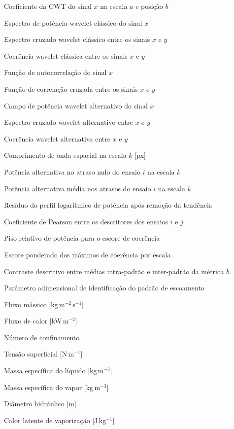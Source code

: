 \begin{simbolos}
  \item[$W_x(a,b)$] Coeficiente da CWT do sinal $x$ na escala $a$ e posição $b$
  \item[$P_x(a,b)$] Espectro de potência wavelet clássico do sinal $x$
  \item[$C_{xy}(a,b)$] Espectro cruzado wavelet clássico entre os sinais $x$ e $y$
  \item[$\gamma_{xy}(a,b)$] Coerência wavelet clássica entre os sinais $x$ e $y$
  \item[$R_{xx}(\tau)$] Função de autocorrelação do sinal $x$
  \item[$R_{xy}(\tau)$] Função de correlação cruzada entre os sinais $x$ e $y$
  \item[$\widetilde{P}_x(a,b)$] Campo de potência wavelet alternativo do sinal $x$
  \item[$\widetilde{C}_{xy}(a,b)$] Espectro cruzado wavelet alternativo entre $x$ e $y$
  \item[$\widetilde{\gamma}_{xy}(a,b)$] Coerência wavelet alternativa entre $x$ e $y$
  \item[$\lambda_k$] Comprimento de onda espacial na escala $k$ [px]
  \item[$P_{ik}$] Potência alternativa no atraso nulo do ensaio $i$ na escala $k$
  \item[$M_{ik}$] Potência alternativa média nos atrasos do ensaio $i$ na escala $k$
  \item[$z_{ik}$] Resíduo do perfil logarítmico de potência após remoção da tendência
  \item[$r_{ij}$] Coeficiente de Pearson entre os descritores dos ensaios $i$ e $j$
  \item[$\eta$] Piso relativo de potência para o escore de coerência
  \item[$S_{xy}^{(\eta)}$] Escore ponderado dos máximos de coerência por escala
  \item[$\Delta_h$] Contraste descritivo entre médias intra-padrão e inter-padrão da métrica $h$
  \item[$\beta$] Parâmetro adimensional de identificação do padrão de escoamento
  \item[$G$] Fluxo mássico [kg\,m$^{-2}$\,s$^{-1}$]
  \item[$q''$] Fluxo de calor [kW\,m$^{-2}$]
  \item[$Co$] Número de confinamento
  \item[$\sigma$] Tensão superficial [N\,m$^{-1}$]
  \item[$\rho_l$] Massa específica do líquido [kg\,m$^{-3}$]
  \item[$\rho_v$] Massa específica do vapor [kg\,m$^{-3}$]
  \item[$D_h$] Diâmetro hidráulico [m]
  \item[$i_{lv}$] Calor latente de vaporização [J\,kg$^{-1}$]
\end{simbolos}

\tableofcontents*
\cleardoublepage
